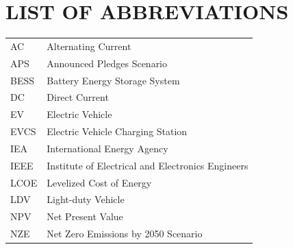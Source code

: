 \documentclass{thesis}
\begin{document}
\section*{LIST OF ABBREVIATIONS}
     {}

    \begin{tabular}{ l l }
    \hspace{1cm} AC & \hspace{2cm} Alternating Current \\
    \hspace{1cm} APS & \hspace{2cm} Announced Pledges Scenario \\
    \hspace{1cm} BESS & \hspace{2cm} Battery Energy Storage System \\
    \hspace{1cm} DC & \hspace{2cm} Direct Current \\
    \hspace{1cm} EV & \hspace{2cm} Electric Vehicle \\
    \hspace{1cm} EVCS & \hspace{2cm} Electric Vehicle Charging Station \\
    \hspace{1cm} IEA & \hspace{2cm} International Energy Agency \\
    \hspace{1cm} IEEE & \hspace{2cm} Institute of Electrical and Electronics Engineers \\
    \hspace{1cm} LCOE & \hspace{2cm} Levelized Cost of Energy \\
    \hspace{1cm} LDV & \hspace{2cm} Light-duty Vehicle \\
    \hspace{1cm} NPV & \hspace{2cm} Net Present Value \\
    \hspace{1cm} NZE & \hspace{2cm} Net Zero Emissions by 2050 Scenario \\

\end{tabular}
\end{document}
